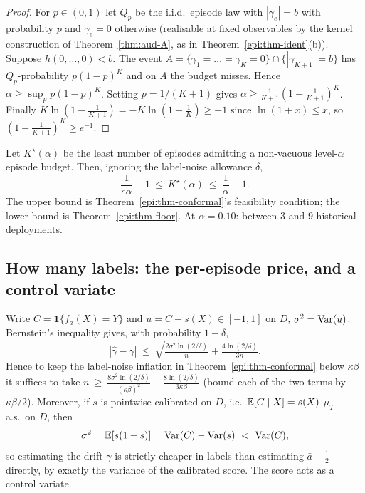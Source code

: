 \begin{proof}
For $p\in(0,1)$ let $Q_p$ be the i.i.d.\ episode law with $|\gamma_e|=b$ with probability $p$ and
$\gamma_e=0$ otherwise (realisable at fixed observables by the kernel construction of
Theorem~\ref{thm:aud-A}, as in Theorem~\ref{epi:thm-ident}(b)). Suppose $h(0,\dots,0)<b$. The event
$A=\{\gamma_1=\dots=\gamma_K=0\}\cap\{|\gamma_{K+1}|=b\}$ has $Q_p$-probability $p(1-p)^K$ and on $A$
the budget misses. Hence $\alpha\ge\sup_{p}p(1-p)^K$. Setting $p=1/(K+1)$ gives
$\alpha\ge\frac1{K+1}(1-\frac1{K+1})^K$. Finally
$K\ln(1-\tfrac1{K+1})=-K\ln(1+\tfrac1K)\ge-1$ since $\ln(1+x)\le x$, so
$(1-\tfrac1{K+1})^K\ge e^{-1}$.
\end{proof}

\begin{corollary}[Bracket]\label{epi:cor-bracket}
Let $K^\star(\alpha)$ be the least number of episodes admitting a non-vacuous level-$\alpha$
episode budget. Then, ignoring the label-noise allowance $\delta$,
\[
\frac1{e\alpha}-1\ \le\ K^\star(\alpha)\ \le\ \frac1\alpha-1 .
\]
The upper bound is Theorem~\ref{epi:thm-conformal}'s feasibility condition; the lower bound is
Theorem~\ref{epi:thm-floor}. At $\alpha=0.10$: between $3$ and $9$ historical deployments.
\end{corollary}

\subsection{How many labels: the per-episode price, and a control variate}

\begin{proposition}\label{epi:prop-labels}
Write $C=\mathbf 1\{f_a(X)=Y\}$ and $u=C-s(X)\in[-1,1]$ on $D$, $\sigma^2=\operatorname{Var}(u)$. Bernstein's
inequality gives, with probability $1-\delta$,
\[
|\widehat\gamma-\gamma|\ \le\ \sqrt{\tfrac{2\sigma^2\ln(2/\delta)}{n}}+\tfrac{4\ln(2/\delta)}{3n}.
\]
Hence to keep the label-noise inflation in Theorem~\ref{epi:thm-conformal} below $\kappa\beta$ it
suffices to take
$n\ \ge\ \tfrac{8\sigma^2\ln(2/\delta)}{(\kappa\beta)^2}+\tfrac{8\ln(2/\delta)}{3\kappa\beta}$
(bound each of the two terms by $\kappa\beta/2$).
Moreover, if $s$ is pointwise calibrated on $D$, i.e.\ $\mathbb{E}[C\mid X]=s(X)$ $\mu_T$-a.s.\ on $D$, then
\[
\sigma^2=\E[s(1-s)]=\Var(C)-\Var(s)\ <\ \Var(C),
\]
so estimating the drift $\gamma$ is strictly cheaper in labels than estimating $\bar a-\tfrac12$
directly, by exactly the variance of the calibrated score. The score acts as a control variate.
\end{proposition}

